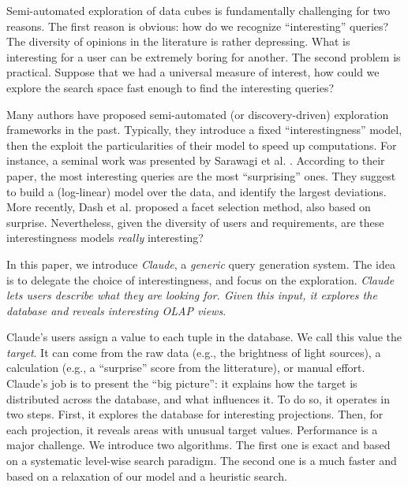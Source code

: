 Semi-automated exploration of data cubes is fundamentally challenging for two
reasons. The first reason is obvious: how do we recognize ``interesting''
queries?  The diversity of opinions in the literature is rather depressing.
What is interesting for a user can be extremely boring for another. The second
problem is practical.  Suppose that we had a universal measure of interest, how
could we explore the search space fast enough to find the interesting queries?

Many authors have proposed semi-automated (or discovery-driven) exploration
frameworks in the past. Typically, they introduce a fixed ``interestingness''
model, then the exploit the particularities of their model to speed up
computations.  For instance, a seminal work was presented by Sarawagi et al.
\cite{sarawagi1998discovery}. According to their paper, the most interesting
queries are the most ``surprising'' ones.  They suggest to build a (log-linear)
model over the data, and identify the largest deviations. More recently, Dash
et al.\cite{dash2008dynamic} proposed a facet selection method, also based on
surprise. Nevertheless, given the diversity of users and requirements, are
these interestingness models \emph{really} interesting?

In this paper, we introduce \textit{Claude}, a \emph{generic} query generation
system.  The idea is to delegate the choice of interestingness, and
focus on the exploration. \emph{Claude lets users describe what they are
looking for.  Given this input, it explores the database and reveals
interesting OLAP views}. 

Claude's users assign a value to each tuple in the database. We call this value
the \emph{target}. It can come from the raw data (e.g., the brightness of light
sources), a calculation (e.g., a ``surprise'' score from the litterature), or
manual effort. Claude's job is to present the ``big picture'': it explains how
the target is distributed across the database, and what influences it. To do
so, it operates in two steps. First, it explores the database for interesting
projections. Then, for each projection, it reveals areas with unusual target
values.  Performance is a major
challenge. We introduce two algorithms.  The first one is exact and based on a
systematic level-wise search paradigm.  The second one is a much faster and
based on a relaxation of our model and a heuristic search.
